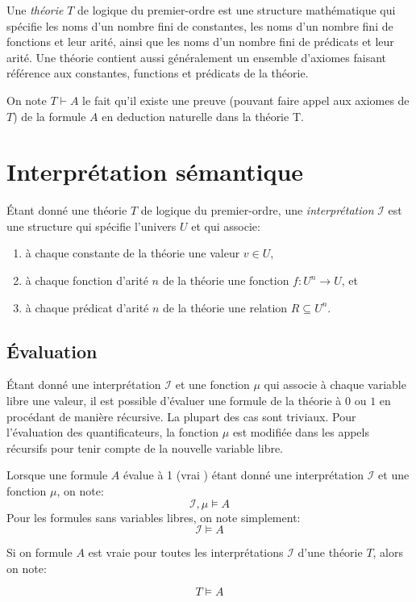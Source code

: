Une \og \textit{théorie} \fg{} $T$ de logique du premier-ordre est une structure mathématique qui spécifie les noms d'un nombre fini de constantes, les noms d'un nombre fini de fonctions et leur arité, ainsi que les noms d'un nombre fini de prédicats et leur arité.
Une théorie contient aussi généralement un ensemble d'axiomes faisant référence aux constantes, functions et prédicats de la théorie.

On note $T \vdash A$ le fait qu'il existe une preuve (pouvant faire appel aux axiomes de $T$) de la formule $A$ en deduction naturelle dans la théorie T.

\section{Interprétation sémantique}

Étant donné une théorie $T$ de logique du premier-ordre, une \og \textit{interprétation} \fg{} $\mathcal{I}$ est une structure qui spécifie l'univers $U$ et qui associe:
\begin{enumerate}
\item à chaque constante de la théorie une valeur $v \in U$,
\item à chaque fonction d'arité $n$ de la théorie une fonction $f : U^n \to U$, et
\item à chaque prédicat d'arité $n$ de la théorie une relation $R \subseteq U^n$.
\end{enumerate}

\subsection{Évaluation}

Étant donné une interprétation $\mathcal{I}$ et une fonction $\mu$ qui associe à chaque variable libre une valeur, il est possible d'évaluer une formule de la théorie à $0$ ou $1$ en procédant de manière récursive.
La plupart des cas sont triviaux. Pour l'évaluation des quantificateurs, la fonction $\mu$ est modifiée dans les appels récursifs pour tenir compte de la nouvelle variable libre.

Lorsque une formule $A$ évalue à 1 (\og vrai \fg{}) étant donné une interprétation $\mathcal{I}$ et une fonction $\mu$, on note:
\[
\mathcal{I}, \mu \vDash A
\]
Pour les formules sans variables libres, on note simplement:
\[
\mathcal{I} \vDash A
\]

Si on formule $A$ est vraie pour toutes les interprétations $\mathcal{I}$ d'une théorie $T$, alors on note:

\[
T \vDash A
\]



